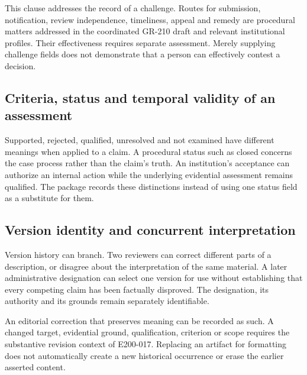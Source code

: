 \documentclass[11pt,a4paper]{article}
\begin{document}
This clause addresses the record of a challenge. Routes for submission, notification, review independence, timeliness, appeal and remedy are procedural matters addressed in the coordinated GR-210 draft and relevant institutional profiles. Their effectiveness requires separate assessment. Merely supplying challenge fields does not demonstrate that a person can effectively contest a decision.


\subsection{Criteria, status and temporal validity of an assessment}

Supported, rejected, qualified, unresolved and not examined have different meanings when applied to a claim. A procedural status such as closed concerns the case process rather than the claim's truth. An institution's acceptance can authorize an internal action while the underlying evidential assessment remains qualified. The package records these distinctions instead of using one status field as a substitute for them.

\subsection{Version identity and concurrent interpretation}

Version history can branch. Two reviewers can correct different parts of a description, or disagree about the interpretation of the same material. A later administrative designation can select one version for use without establishing that every competing claim has been factually disproved. The designation, its authority and its grounds remain separately identifiable.

An editorial correction that preserves meaning can be recorded as such. A changed target, evidential ground, qualification, criterion or scope requires the substantive revision context of E200-017. Replacing an artifact for formatting does not automatically create a new historical occurrence or erase the earlier asserted content.
\end{document}
